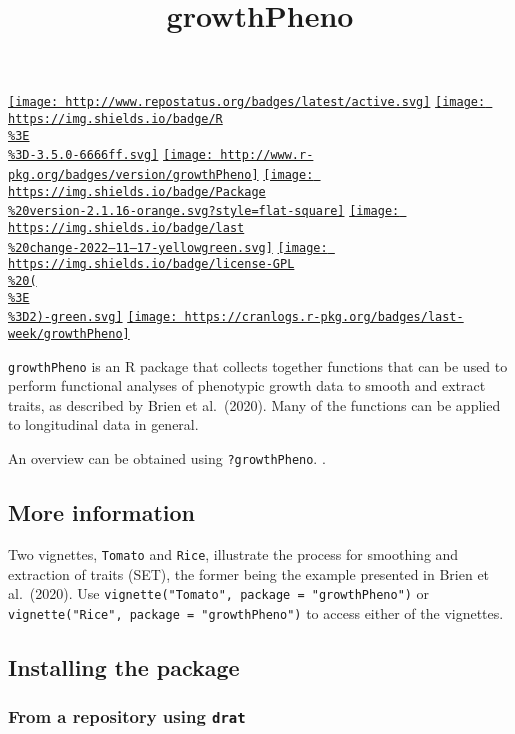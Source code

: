 \documentclass[
]{article}
\title{growthPheno}
\author{}
\date{\vspace{-2.5em}}
\begin{document}
\maketitle

\href{http://www.repostatus.org/\#active}{\texttt{[image: http://www.repostatus.org/badges/latest/active.svg]}}
\href{https://cran.r-project.org/}{\texttt{[image: https://img.shields.io/badge/R\\\%3E\\\%3D-3.5.0-6666ff.svg]}}
\href{https://cran.r-project.org/package=growthPheno}{\texttt{[image: http://www.r-pkg.org/badges/version/growthPheno]}}
\href{/commits/master}{\texttt{[image: https://img.shields.io/badge/Package\\\%20version-2.1.16-orange.svg?style=flat-square]}}
\href{/commits/master}{\texttt{[image: https://img.shields.io/badge/last\\\%20change-2022--11--17-yellowgreen.svg]}}
\href{http://choosealicense.com/licenses/gpl-2.0/}{\texttt{[image: https://img.shields.io/badge/license-GPL\\\%20(\\\%3E\\\%3D2)-green.svg]}}
\href{commits/master}{\texttt{[image: https://cranlogs.r-pkg.org/badges/last-week/growthPheno]}}

\texttt{growthPheno} is an R package that collects together functions
that can be used to perform functional analyses of phenotypic growth
data to smooth and extract traits, as described by Brien et al.~(2020).
Many of the functions can be applied to longitudinal data in general.

An overview can be obtained using \texttt{?growthPheno}. .

\hypertarget{more-information}{%
\subsection{More information}\label{more-information}}

Two vignettes, \texttt{Tomato} and \texttt{Rice}, illustrate the process
for smoothing and extraction of traits (SET), the former being the
example presented in Brien et al.~(2020). Use
\texttt{vignette("Tomato",\ package\ =\ "growthPheno")} or
\texttt{vignette("Rice",\ package\ =\ "growthPheno")} to access either
of the vignettes.

\hypertarget{installing-the-package}{%
\subsection{Installing the package}\label{installing-the-package}}

\hypertarget{from-a-repository-using-drat}{%
\subsubsection{\texorpdfstring{From a repository using
\texttt{drat}}{From a repository using drat}}\label{from-a-repository-using-drat}}
\end{document}
